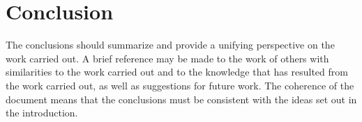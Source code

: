 \chapter{Conclusion}\label{cap5}

The conclusions should summarize and provide a unifying perspective on the work carried out. A brief reference may be made to the work of others with similarities to the work carried out and to the knowledge that has resulted from the work carried out, as well as suggestions for future work. The coherence of the document means that the conclusions must be consistent with the ideas set out in the introduction.
